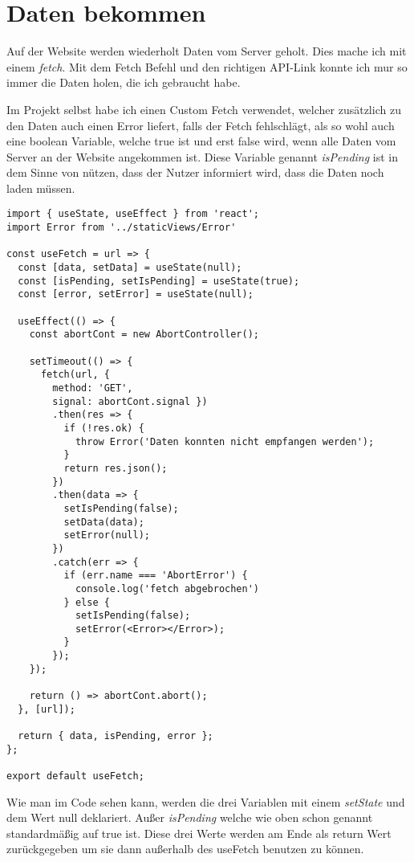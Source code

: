 \pagebreak
\section{Daten bekommen}
\label{getData}

Auf der Website werden wiederholt Daten vom Server geholt. Dies mache ich mit einem \textit{fetch}.
Mit dem Fetch Befehl und den richtigen API-Link konnte ich mur so immer die Daten holen, die ich
gebraucht habe. 


Im Projekt selbst habe ich einen Custom Fetch verwendet, welcher zusätzlich zu den Daten auch einen 
Error liefert, falls der Fetch fehlschlägt, als so wohl auch eine boolean Variable, welche true ist und 
erst false wird, wenn alle Daten vom Server an der Website angekommen ist. Diese Variable genannt 
\textit{isPending} ist in dem Sinne von nützen, dass der Nutzer informiert wird, dass die Daten noch
laden müssen.

\begin{lstlisting}
import { useState, useEffect } from 'react';
import Error from '../staticViews/Error'

const useFetch = url => {
  const [data, setData] = useState(null);
  const [isPending, setIsPending] = useState(true);
  const [error, setError] = useState(null);

  useEffect(() => {
    const abortCont = new AbortController();

    setTimeout(() => {
      fetch(url, {
        method: 'GET',
        signal: abortCont.signal })
        .then(res => {
          if (!res.ok) {
            throw Error('Daten konnten nicht empfangen werden');
          }
          return res.json();
        })
        .then(data => {
          setIsPending(false);
          setData(data);
          setError(null);
        })
        .catch(err => {
          if (err.name === 'AbortError') {
            console.log('fetch abgebrochen')
          } else {
            setIsPending(false);
            setError(<Error></Error>);
          }
        });
    });

    return () => abortCont.abort();
  }, [url]);

  return { data, isPending, error };
};

export default useFetch;

\end{lstlisting}

Wie man im Code sehen kann, werden die drei Variablen mit einem \textit{setState} und dem Wert null
deklariert. Außer \textit{isPending} welche wie oben schon genannt standardmäßig auf true ist. Diese
drei Werte werden am Ende als return Wert zurückgegeben um sie dann außerhalb des useFetch benutzen 
zu können.


